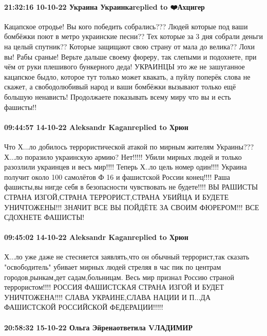 \paragraph{21:32:16 10-10-22 Украина Украинкаreplied to ❤️Ахцигер}

Кацапское отродье! Вы кого победить собрались??? Людей которые под ваши
бомбёжки поют в метро украинские песни?? Тех которые за 3 дня собрали деньги на
целый спутник?? Которые защищают свою страну от мала до велика?? Лохи вы! Рабы
сраные! Верьте дальше своему фюреру, так слепыми и подохнете, при чём от руки
плешивого бункерного деда! УКРАИНЦЫ это же не зашуганное кацапское быдло,
которое тут только может квакать, а пуйлу поперёк слова не скажет, а
свободолюбивый народ и ваши бомбёжки вызывают только ещё большую ненависть!
Продолжаете показывать всему миру что вы и есть фашисты!!

\paragraph{09:44:57 14-10-22 Aleksandr Kaganreplied to Хрюн}

Что Х...ло добилось террористической атакой по мирным жителям Украины??? Х...ло
поразило украинскую армию? Нет!!!!! Убили мирных людей и только разозлили
украинцев и весъ мир!!!! Теперь Х..ло цель номер один!!!! Украина получит около
100 самолётов Ф 16 и фашистской России конец!!!! Раша фашисты,вы нигде себя в
безопасности чувствовать не будете!!!! ВЫ РАШИСТЫ СТРАНА ИЗГОЙ,СТРАНА
ТЕРРОРИСТ,СТРАНА УБИЙЦА И БУДЕТЕ УНИЧТОЖЕНЫ!!! ЗНАЧИТ ВСЕ ВЫ ПОЙДЁТЕ ЗА СВОИМ
ФЮРЕРОМ!!! ВСЕ СДОХНЕТЕ ФАШИСТЫ!

\paragraph{09:45:02 14-10-22 Aleksandr Kaganreplied to Хрюн}

Х...ло уже даже не стесняется заявлять,что он обычный террорист,так сказать
"освободитель" убивает мирных людей стреляя в час пик по центрам
городов,рынкам,дет садам,больницам. Весь мир признал Россию страной
террористом!!!! РОССИЯ ФАШИСТСКАЯ СТРАНА ИЗГОЙ И БУДЕТ УНИЧТОЖЕНА!!!! СЛАВА
УКРАИНЕ,СЛАВА НАЦИИ И П...ДА ФАШИСТСКОЙ РОССИЙСКОЙ ФЕДЕРАЦИИ!!!!!

\paragraph{20:58:32 15-10-22 Ольга Эйренаответила VЛАДИМИР}


